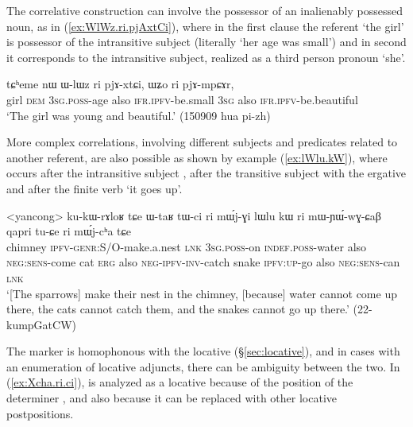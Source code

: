 The correlative construction can involve the possessor of an inalienably possessed noun, as in (\ref{ex:WlWz.ri.pjAxtCi}), where in the first clause the referent `the girl' is possessor of the intransitive subject (literally `her age was small') and in second it corresponds to the intransitive subject, realized as a third person pronoun  `she'.

  \begin{exe}
\ex \label{ex:WlWz.ri.pjAxtCi}
 \gll tɕʰeme nɯ ɯ-lɯz ri pjɤ-xtɕi, ɯʑo ri pjɤ-mpɕɤr,  \\
 girl \textsc{dem} \textsc{3sg}.\textsc{poss}-age also \textsc{ifr}.\textsc{ipfv}-be.small \textsc{3sg} also \textsc{ifr}.\textsc{ipfv}-be.beautiful \\
\glt `The girl was young and beautiful.' (150909 hua pi-zh)
 \end{exe}
 
 More complex correlations, involving different subjects and predicates related to another referent, are also possible as shown by example (\ref{ex:lWlu.kW}), where  occurs after the intransitive subject , after the transitive subject  with the ergative and after the finite verb  `it goes up'.
 
 \begin{exe}
\ex   \label{ex:lWlu.kW}
\gll <yancong> ku-kɯ-rɤloʁ tɕe ɯ-taʁ tɯ-ci ri mɯ́j-ɣi lɯlu kɯ ri mɯ-ɲɯ́-wɣ-ɕaβ qapri tu-ɕe ri mɯ́j-cʰa tɕe \\
 chimney \textsc{ipfv}-\textsc{genr}:S/O-make.a.nest \textsc{lnk} \textsc{3sg}.\textsc{poss}-on \textsc{indef}.\textsc{poss}-water also \textsc{neg}:\textsc{sens}-come cat \textsc{erg} also \textsc{neg}-\textsc{ipfv}-\textsc{inv}-catch snake \textsc{ipfv}:\textsc{up}-go also \textsc{neg}:\textsc{sens}-can \textsc{lnk} \\
 \glt `[The sparrows] make their nest in the chimney, [because] water cannot come up there, the cats cannot catch them, and the snakes cannot go up there.' (22-kumpGatCW)
 \end{exe} 
 
 The marker  is homophonous with the locative  (§\ref{sec:locative}), and in cases with an enumeration of locative adjuncts, there can be ambiguity between the two. In (\ref{ex:Xcha.ri.ci}),  is analyzed as a locative because of the position of the determiner , and also because it can be replaced with other locative postpositions.
 
